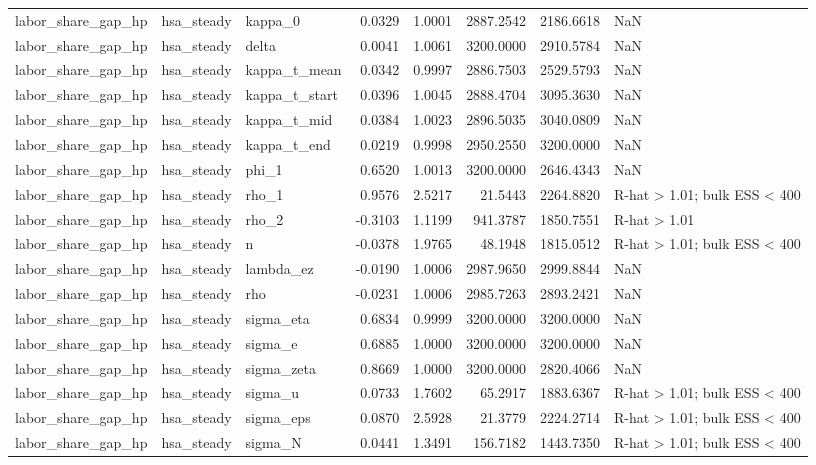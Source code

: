 \begin{tabular}{lllrrrrl}
labor\_share\_gap\_hp & hsa\_steady & kappa\_0 & 0.0329 & 1.0001 & 2887.2542 & 2186.6618 & NaN \\
labor\_share\_gap\_hp & hsa\_steady & delta & 0.0041 & 1.0061 & 3200.0000 & 2910.5784 & NaN \\
labor\_share\_gap\_hp & hsa\_steady & kappa\_t\_mean & 0.0342 & 0.9997 & 2886.7503 & 2529.5793 & NaN \\
labor\_share\_gap\_hp & hsa\_steady & kappa\_t\_start & 0.0396 & 1.0045 & 2888.4704 & 3095.3630 & NaN \\
labor\_share\_gap\_hp & hsa\_steady & kappa\_t\_mid & 0.0384 & 1.0023 & 2896.5035 & 3040.0809 & NaN \\
labor\_share\_gap\_hp & hsa\_steady & kappa\_t\_end & 0.0219 & 0.9998 & 2950.2550 & 3200.0000 & NaN \\
labor\_share\_gap\_hp & hsa\_steady & phi\_1 & 0.6520 & 1.0013 & 3200.0000 & 2646.4343 & NaN \\
labor\_share\_gap\_hp & hsa\_steady & rho\_1 & 0.9576 & 2.5217 & 21.5443 & 2264.8820 & R-hat > 1.01; bulk ESS < 400 \\
labor\_share\_gap\_hp & hsa\_steady & rho\_2 & -0.3103 & 1.1199 & 941.3787 & 1850.7551 & R-hat > 1.01 \\
labor\_share\_gap\_hp & hsa\_steady & n & -0.0378 & 1.9765 & 48.1948 & 1815.0512 & R-hat > 1.01; bulk ESS < 400 \\
labor\_share\_gap\_hp & hsa\_steady & lambda\_ez & -0.0190 & 1.0006 & 2987.9650 & 2999.8844 & NaN \\
labor\_share\_gap\_hp & hsa\_steady & rho & -0.0231 & 1.0006 & 2985.7263 & 2893.2421 & NaN \\
labor\_share\_gap\_hp & hsa\_steady & sigma\_eta & 0.6834 & 0.9999 & 3200.0000 & 3200.0000 & NaN \\
labor\_share\_gap\_hp & hsa\_steady & sigma\_e & 0.6885 & 1.0000 & 3200.0000 & 3200.0000 & NaN \\
labor\_share\_gap\_hp & hsa\_steady & sigma\_zeta & 0.8669 & 1.0000 & 3200.0000 & 2820.4066 & NaN \\
labor\_share\_gap\_hp & hsa\_steady & sigma\_u & 0.0733 & 1.7602 & 65.2917 & 1883.6367 & R-hat > 1.01; bulk ESS < 400 \\
labor\_share\_gap\_hp & hsa\_steady & sigma\_eps & 0.0870 & 2.5928 & 21.3779 & 2224.2714 & R-hat > 1.01; bulk ESS < 400 \\
labor\_share\_gap\_hp & hsa\_steady & sigma\_N & 0.0441 & 1.3491 & 156.7182 & 1443.7350 & R-hat > 1.01; bulk ESS < 400 \\

\end{tabular}
